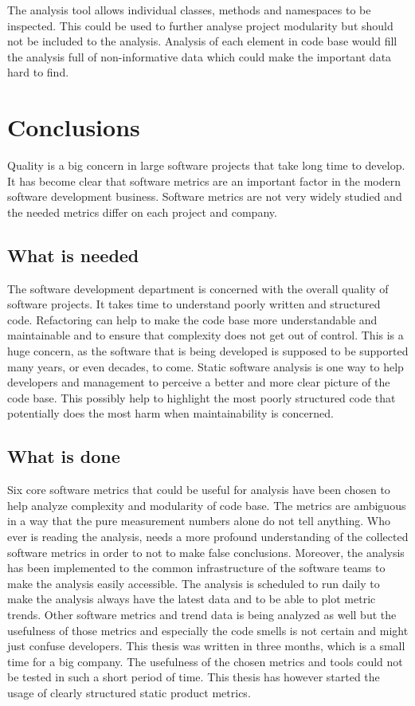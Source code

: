 The analysis tool allows individual classes, methods and namespaces to be inspected. This could be used to further analyse project modularity but should not be included to the analysis. Analysis of each element in code base would fill the analysis full of non-informative data which could make the important data hard to find.


\chapter{Conclusions}

Quality is a big concern in large software projects that take long time to develop.
It has become clear that software metrics are an important factor in the modern software development business. Software metrics are not very widely studied and the needed metrics differ on each project and company. 

\section{What is needed}

The software development department is concerned with the overall quality of software projects. It takes time to understand poorly written and structured code. Refactoring can help to make the code base more understandable and maintainable and to ensure that complexity does not get out of control. This is a huge concern, as the software that is being developed is supposed to be supported many years, or even decades, to come. Static software analysis is one way to help developers and management to perceive a better and more clear picture of the code base. This possibly help to highlight the most poorly structured code that potentially does the most harm when maintainability is concerned.

\section{What is done}

Six core software metrics that could be useful for analysis have been chosen to help analyze complexity and modularity of code base. The metrics are ambiguous in a way that the pure measurement numbers alone do not tell anything. Who ever is reading the analysis, needs a more profound understanding of the collected software metrics in order to not to make false conclusions. Moreover, the analysis has been implemented to the common infrastructure of the software teams to make the analysis easily accessible. The analysis is scheduled to run daily to make the analysis always have the latest data and to be able to plot metric trends. Other software metrics and trend data is being analyzed as well but the usefulness of those metrics and especially the code smells is not certain and might just confuse developers. This thesis was written in three months, which is a small time for a big company. The usefulness of the chosen metrics and tools could not be tested in such a short period of time. This thesis has however started the usage of clearly structured static product metrics.

